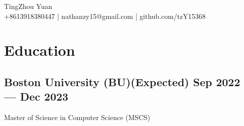 \documentclass[a4,12pt]{article}
\newcommand{\hskills}[1]{
\textbf{\bfseries #1} }
\begin{document}
\begin{center}
    \begin{minipage}[b]{0.7\textwidth}
            \centering
            {\huge TingZhou Yuan} \\ %
            \vspace{0.1cm}
           +8613918380447 | nathanzy15@gmail.com | github.com/tzY15368
    \end{minipage}%
    
\vspace{-0.35cm} 
\end{center}

\section{\textbf{Education}}

\subsection*{Boston University (BU)\hfill \textbf{(Expected) Sep 2022 --- Dec 2023}}
Master of Science in Computer Science (MSCS)\\
\end{document}
